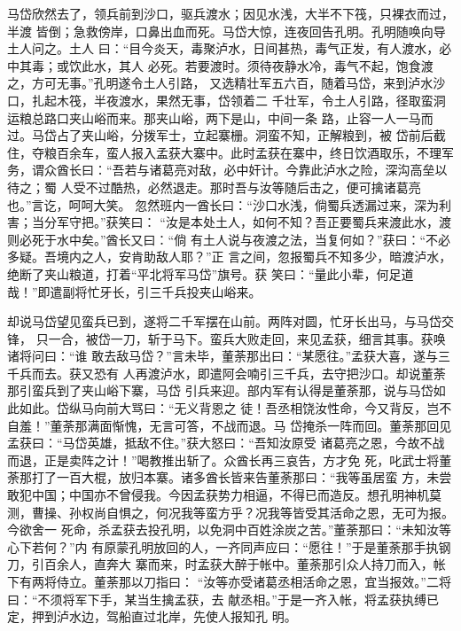 马岱欣然去了，领兵前到沙口，驱兵渡水；因见水浅，大半不下筏，只裸衣而过，半渡
皆倒；急救傍岸，口鼻出血而死。马岱大惊，连夜回告孔明。孔明随唤向导土人问之。土人
曰：“目今炎天，毒聚泸水，日间甚热，毒气正发，有人渡水，必中其毒；或饮此水，其人
必死。若要渡时。须待夜静水冷，毒气不起，饱食渡之，方可无事。”孔明遂令土人引路，
又选精壮军五六百，随着马岱，来到泸水沙口，扎起木筏，半夜渡水，果然无事，岱领着二
千壮军，令土人引路，径取蛮洞运粮总路口夹山峪而来。那夹山峪，两下是山，中间一条
路，止容一人一马而过。马岱占了夹山峪，分拨军士，立起寨栅。洞蛮不知，正解粮到，被
岱前后截住，夺粮百余车，蛮人报入孟获大寨中。此时孟获在寨中，终日饮酒取乐，不理军
务，谓众酋长曰：“吾若与诸葛亮对敌，必中奸计。今靠此泸水之险，深沟高垒以待之；蜀
人受不过酷热，必然退走。那时吾与汝等随后击之，便可擒诸葛亮也。”言讫，呵呵大笑。
忽然班内一酋长曰：“沙口水浅，倘蜀兵透漏过来，深为利害；当分军守把。”获笑曰：
“汝是本处土人，如何不知？吾正要蜀兵来渡此水，渡则必死于水中矣。”酋长又曰：“倘
有土人说与夜渡之法，当复何如？”获曰：“不必多疑。吾境内之人，安肯助敌人耶？”正
言之间，忽报蜀兵不知多少，暗渡泸水，绝断了夹山粮道，打着“平北将军马岱”旗号。获
笑曰：“量此小辈，何足道哉！”即遣副将忙牙长，引三千兵投夹山峪来。

却说马岱望见蛮兵已到，遂将二千军摆在山前。两阵对圆，忙牙长出马，与马岱交锋，
只一合，被岱一刀，斩于马下。蛮兵大败走回，来见孟获，细言其事。获唤诸将问曰：“谁
敢去敌马岱？”言未毕，董荼那出曰：“某愿往。”孟获大喜，遂与三千兵而去。获又恐有
人再渡泸水，即遣阿会喃引三千兵，去守把沙口。却说董荼那引蛮兵到了夹山峪下寨，马岱
引兵来迎。部内军有认得是董荼那，说与马岱如此如此。岱纵马向前大骂曰：“无义背恩之
徒！吾丞相饶汝性命，今又背反，岂不自羞！”董荼那满面惭愧，无言可答，不战而退。马
岱掩杀一阵而回。董荼那回见孟获曰：“马岱英雄，抵敌不住。”获大怒曰：“吾知汝原受
诸葛亮之恩，今故不战而退，正是卖阵之计！”喝教推出斩了。众酋长再三哀告，方才免
死，叱武士将董荼那打了一百大棍，放归本寨。诸多酋长皆来告董荼那曰：“我等虽居蛮
方，未尝敢犯中国；中国亦不曾侵我。今因孟获势力相逼，不得已而造反。想孔明神机莫
测，曹操、孙权尚自惧之，何况我等蛮方乎？况我等皆受其活命之恩，无可为报。今欲舍一
死命，杀孟获去投孔明，以免洞中百姓涂炭之苦。”董荼那曰：“未知汝等心下若何？”内
有原蒙孔明放回的人，一齐同声应曰：“愿往！”于是董荼那手执钢刀，引百余人，直奔大
寨而来，时孟获大醉于帐中。董荼那引众人持刀而入，帐下有两将侍立。董荼那以刀指曰：
“汝等亦受诸葛丞相活命之恩，宜当报效。”二将曰：“不须将军下手，某当生擒孟获，去
献丞相。”于是一齐入帐，将孟获执缚已定，押到泸水边，驾船直过北岸，先使人报知孔
明。

